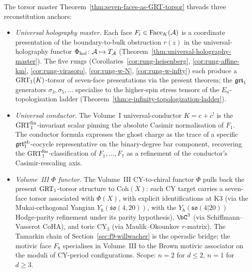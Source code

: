 \begin{remark}
\label{rem:grt-climax-anchors}
The torsor master Theorem~\ref{thm:seven-faces-as-GRT-torsor}
threads three reconstitution anchors:
\begin{itemize}
\item[(a)] \emph{Universal holography master.} Each face
 $F_i \in \mathrm{Face}_K(\mathcal{A})$ is a coordinate presentation of the
 boundary-to-bulk obstruction $r(z)$ in the universal-holography
 functor $\Phi_{\mathrm{hol}}\colon \mathcal{A}\mapsto T_{\mathcal{A}}$
 (Theorem~\ref{thm:universal-holography-master}). The five rungs
 (Corollaries~\ref{cor:rung-heisenberg}, \ref{cor:rung-affine-km},
 \ref{cor:rung-virasoro}, \ref{cor:rung-w-N},
 \ref{cor:rung-w-infty}) each produce a $\mathrm{GRT}_1(K)$-torsor
 of seven-face presentations via the present theorem; the $\mathfrak{grt}_1$
 generators $\sigma_3, \sigma_5, \dots$ specialise to the higher-spin
 stress tensors of the $E_{n}$-topologisation ladder
 (Theorem~\ref{thm:e-infinity-topologization-ladder}).
\item[(b)] \emph{Universal conductor.} The Volume~I universal-conductor
 $K = c + c^{!}$ is the $\mathrm{GRT}_1^{\mathrm{fin}}$-invariant scalar
 pinning the absolute Casimir normalisation of $F_1$. The conductor
 formula expresses the ghost charge as the trace of a specific
 $\mathfrak{grt}_1^{\mathrm{ab}}$-cocycle representative on the binary-degree
 bar component, recovering the
 $\mathrm{GRT}_1^{\mathrm{fin}}$-classification of $F_1, \dots, F_7$ as a
 refinement of the conductor's Casimir-rescaling axis.
\item[(c)] \emph{Volume~III $\Phi$ functor.} The Volume~III
 CY-to-chiral functor $\Phi$ pulls back the present $\mathrm{GRT}_1$-torsor
 structure to $\mathrm{Coh}(X)$: each CY target carries a seven-face
 torsor associated with $\Phi(X)$, with explicit identifications at
 K3 (via the Mukai-orthogonal Yangian
 $Y_{\hbar}(\mathfrak{so}(4,20))$, with the
 $Y_{\hbar}(\mathfrak{so}(4|20))$ Hodge-parity refinement under its
 parity hypothesis), $\bC^{3}$
 (via Schiffmann--Vasserot CoHA), and toric CY${}_{3}$ (via
 Maulik--Okounkov $r$-matrix). The
 Tamarkin chain of Section~\ref{sec:f9-willwacher} is the operadic
 bridge; the motivic face $F_8$ specialises in Volume~III to the
 Brown motivic associator on the moduli of CY-period configurations.
 Scope: $n=2$ for $d\le 2$, $n=1$ for $d\ge 3$.
\end{itemize}
\end{remark}

